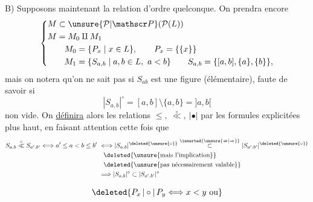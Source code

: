 B) Supposons maintenant la relation d'ordre quelconque. On prendra encore
\[
\left\{\begin{aligned}
 &M\subset\unsure{\mathcal P|\mathscr P}(\mathcal P(L))\\
 &M=M_0\amalg M_1\\
 &\qquad M_0=\{P_x\mid x\in L\},\qquad P_x=\{\{x\}\}\\
 &\qquad M_1=\{S_{a,b}\mid a,b\in L,\ a<b\}\qquad
 S_{a,b}=\{[a,b],\{a\},\{b\}\},
\end{aligned}\right.
\]
mais on notera qu'on ne sait pas si $S_{ab}$ est une figure (élémentaire), faute de savoir si
\[
 |S_{a,b}|^\circ=[a,b]\setminus\{a,b\}=]a,b[
\]
 non vide. On \uline{définira} alors les relations $\leq,\ \overset{\circ}{\ll},\ |\bullet|$ par les formules explicitées plus haut, en faisant attention cette fois que
\[
\begin{aligned}
 S_{a,b}\overset{\circ}{\ll}S_{a',b'}\Longleftrightarrow a'\leq a<b\leq b'
 &\ \Longleftrightarrow |S_{a,b}|^{\deleted{\unsure{\circ}}}\overset{\inserted{\unsure{\nRightarrow|\Rightarrow}}}{\subset}|S_{a',b'}|^{\deleted{\unsure{\circ}}}\\
 &\quad\deleted{\text{\unsure{mais l'implication}}}\\
 &\quad\deleted{\text{\unsure{pas nécessairement valable}}}\\
 &\ \Longrightarrow |S_{a,b}|^\circ\subset|S_{a',b'}|^\circ
\end{aligned}
\]

\[
\deleted{P_x\,|\circ|\,P_y\Longleftrightarrow x<y\ \text{ou}}
\]

